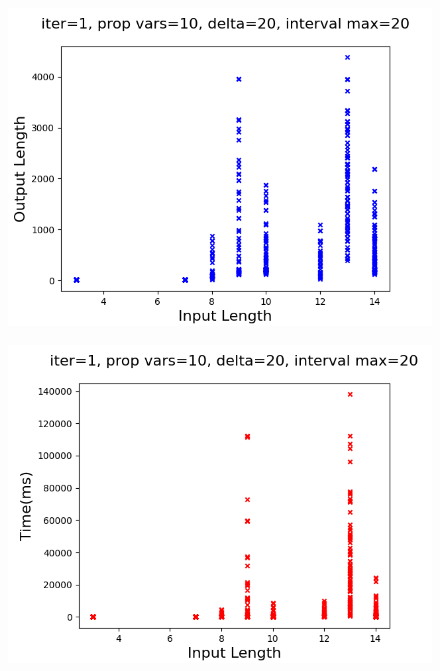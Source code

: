 \documentclass[runningheads]{llncs}
\begin{document}
\begin{minipage}{0.5 \textwidth}
    \begin{figure}[H]
    \centering
    \includegraphics[scale=0.35]{images/Sim2Length_large.png}
    \label{fig:InVsOutLen2}
    \end{figure}
\end{minipage}
\begin{minipage}{0.5 \textwidth}
    \begin{figure}[H]
    \centering
    \includegraphics[scale=0.35]{images/Sim2Time_large.png}
    \label{fig:InLenVsRunTime2}
    \end{figure}
\end{minipage}\\
\end{document}
